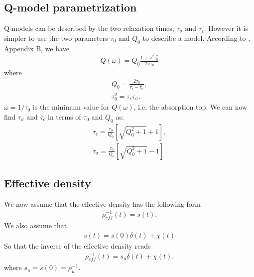 \documentclass[11pt]{article}
\begin{document}
{\subsection*{Q-model parametrization}
Q-models can be described by the two relaxation times, $\tau_{\sigma}$
and $\tau_{\epsilon}$. However it is simpler to use the two parameters
$\tau_0$ and $Q_0$ to describe a model.
According to \cite{Casula1992}, Appendix B, we have
\begin{eqnarray*}
  Q(\omega) = Q_0\frac{1+\omega^2\tau_0^2}{2\omega\tau_0}
\end{eqnarray*}
where
\begin{eqnarray*}
  Q_0 = \frac{2\tau_0}{\tau_{\epsilon} -\tau_{\sigma}}, \\
  \tau_0^2 = \tau_{\epsilon}\tau_{\sigma}.
\end{eqnarray*}
$\omega=1/\tau_0$ is the minimum value for $Q(\omega)$, i.e. the
absorption top.
We can now find $\tau_{\sigma}$ and $\tau_{\epsilon}$ in terms of
$\tau_0$ and $Q_0$ as:
\begin{eqnarray*}
  \tau_{\epsilon} = \frac{\tau_0}{Q_0}\left[\sqrt{Q^2_0+1} +1\right], \\
  \tau_{\sigma} = \frac{\tau_0}{Q_0}\left[\sqrt{Q^2_0+1} -1\right].
\end{eqnarray*}
\subsection*{Effective density} 
We now assume that the effective density has the following form
\begin{eqnarray}
 \rho^{-1}_{eff}(t) = s(t).
\end{eqnarray}
We also assume that 
\begin{eqnarray}
 s(t) = s(0)\delta(t)+\chi(t)
\end{eqnarray}
So that the inverse of the effective density reads
\begin{eqnarray}
 \rho^{-1}_{eff}(t) = s_u\delta(t)+\chi(t).
\end{eqnarray}
where $s_u = s(0)=\rho^{-1}_u$.

}
\end{document}
